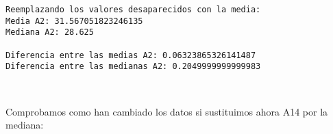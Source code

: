 \documentclass[11pt]{article}
\begin{document}
    \begin{Verbatim}[commandchars=\\\{\}]
Reemplazando los valores desaparecidos con la media:
Media A2: 31.567051823246135
Mediana A2: 28.625

Diferencia entre las medias A2: 0.06323865326141487
Diferencia entre las medianas A2: 0.2049999999999983

    \end{Verbatim}

    \begin{center}
    \end{center}
    { \hspace*{\fill} \\}
    
    Comprobamos como han cambiado los datos si sustituimos ahora A14 por la
mediana:
\end{document}

